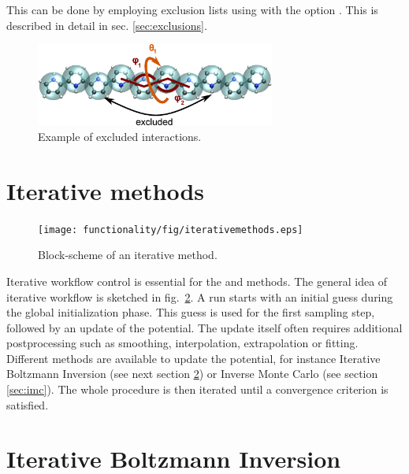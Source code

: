 This can be done by employing exclusion lists using  with the option . This is described in detail in sec. \ref{sec:exclusions}.
\begin{figure}[h]
  \centering
  \includegraphics[width=0.7\textwidth]{fig/excl}
  \caption{\label{fig:excl}Example of excluded interactions.}
\end{figure}


\newpage
\section{Iterative methods}
\label{sec:theory_iterative_methods}

\begin{figure}  
\texttt{[image: functionality/fig/iterativemethods.eps]}
  \caption{
    \label{fig:iterative_methods}
    Block-scheme of an iterative method.
  }
\end{figure}
Iterative workflow control is essential for the \ibi and \imc methods. The general idea of iterative workflow is sketched in fig.~\ref{fig:iterative_methods}. A run starts with an initial guess during the global initialization phase. This guess is used for the first sampling step, followed by an update of the potential. The update itself often requires additional postprocessing such as smoothing, interpolation, extrapolation or fitting. Different methods are available to update the potential, for instance Iterative Boltzmann Inversion (see next section \ref{sec:ibi}) or Inverse Monte Carlo (see section \ref{sec:imc}). The whole procedure is then iterated until a convergence criterion is satisfied.


\section{Iterative Boltzmann Inversion}
\label{sec:ibi}

